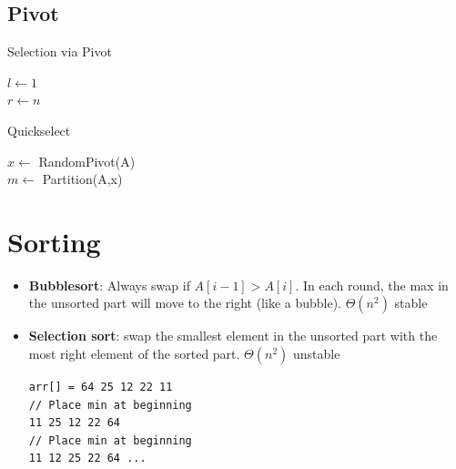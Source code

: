 \documentclass[10pt,landscape,a4paper, table]{extarticle}
\begin{document}
\begin{multicols*}{3}
\subsection{Pivot}
{\scriptsize
\begin{algorithm}[H]
    \caption{Selection via Pivot}
    \label{FWAlgorithm}
    \SetAlgoLined
    $l \leftarrow 1$\\
    $r \leftarrow n$
\end{algorithm}}

{\scriptsize
\begin{algorithm}[H]
    \caption{Quickselect}
    \label{FWAlgorithm}
    \SetAlgoLined
    $x \leftarrow$ RandomPivot(A)\\
    $m \leftarrow$ Partition(A,x)\\
\end{algorithm}}
\section{Sorting}

\begin{itemize}
    \item \textbf{Bubblesort}: Always swap if $A[i-1]> A[i]$. In each round, the max in the unsorted part will move to the right (like a bubble). $\Theta(n^2)$ stable
    \item \textbf{Selection sort}: swap the smallest element in the unsorted part with the most right element of the sorted part. $\Theta(n^2)$ unstable
    
    \begin{verbatim}
arr[] = 64 25 12 22 11
// Place min at beginning
11 25 12 22 64
// Place min at beginning
11 12 25 22 64 ...
    \end{verbatim}
    

\end{itemize}
\end{multicols*}
\end{document}
